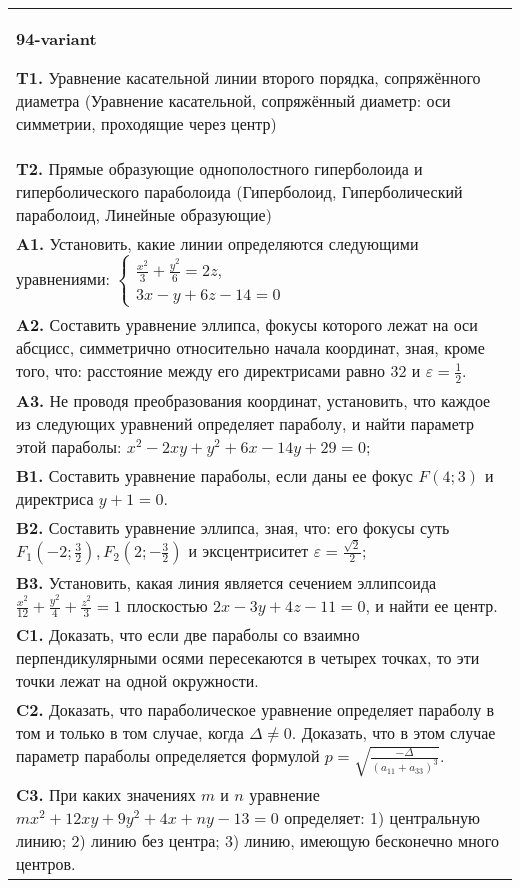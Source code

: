 \documentclass{article}
\begin{document}
\begin{tabular}{m{17cm}}
\textbf{94-variant}
\newline

\textbf{T1.} Уравнение касательной линии второго порядка, сопряжённого диаметра (Уравнение касательной, сопряжённый диаметр: оси симметрии, проходящие через центр) \\
\textbf{T2.} Прямые образующие однополостного гиперболоида и гиперболического параболоида (Гиперболоид, Гиперболический параболоид, Линейные образующие) \\
\textbf{A1.} Установить, какие линии определяются следующими уравнениями: $\left\{\begin{array}{l}\frac{x^2}{3}+\frac{y^2}{6}=2 z, \\ 3 x-y+6 z-14=0\end{array}\right.$ \\
\textbf{A2.} Составить уравнение эллипса, фокусы которого лежат на оси абсцисс, симметрично относительно начала координат, зная, кроме того, что: расстояние между его директрисами равно 32 и $\varepsilon=\frac{1}{2}$. \\
\textbf{A3.} Не проводя преобразования координат, установить, что каждое из следующих уравнений определяет параболу, и найти параметр этой параболы: $x^2-2 x y+y^2+6 x-14 y+29=0$; \\
\textbf{B1.} Составить уравнение параболы, если даны ее фокус $F(4 ; 3)$ и директриса $y+1=0$. \\
\textbf{B2.} Составить уравнение эллипса, зная, что: его фокусы суть $F_1\left(-2 ; \frac{3}{2}\right), F_2\left(2 ;-\frac{3}{2}\right)$ и эксцентриситет $\varepsilon=\frac{\sqrt{2}}{2}$; \\
\textbf{B3.} Установить, какая линия является сечением эллипсоида $\frac{x^2}{12}+\frac{y^2}{4}+\frac{z^2}{3}=1$ плоскостью $2 x-3 y+4 z-11=0$, и найти ее центр. \\
\textbf{C1.} Доказать, что если две параболы со взаимно перпендикулярными осями пересекаются в четырех точках, то эти точки лежат на одной окружности. \\
\textbf{C2.} Доказать, что параболическое уравнение определяет параболу в том и только в том случае, когда $\Delta \neq 0$. Доказать, что в этом случае параметр параболы определяется формулой $p=\sqrt{\frac{-\Delta}{ (a_{11}+a_{33}) ^3}}$. \\
\textbf{C3.} При каких значениях $m$ и $n$ уравнение $m x^2+12 x y+9 y^2+4 x+n y-13=0$ определяет: 1) центральную линию; 2) линию без центра; 3) линию, имеющую бесконечно много центров. \\

\end{tabular}
\vspace{1cm}
\end{document}
